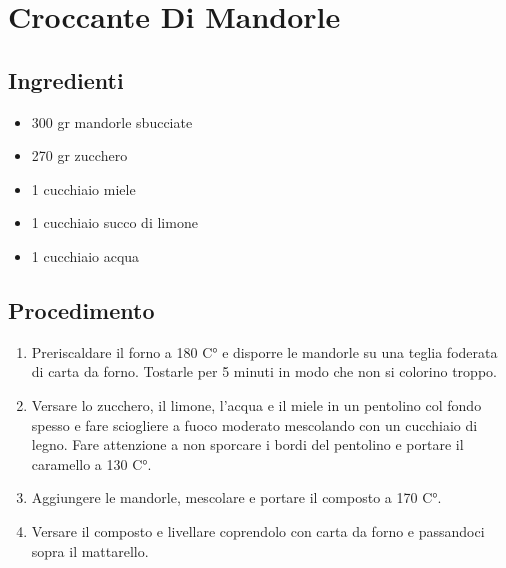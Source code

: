 \section{Croccante Di Mandorle}
\subsection{Ingredienti}
\begin{itemize}
\item 300 gr mandorle sbucciate  
\item 270 gr zucchero  
\item 1 cucchiaio miele  
\item 1 cucchiaio succo di limone  
\item 1 cucchiaio acqua
\end{itemize}
\subsection{Procedimento}
\begin{enumerate}
\item  Preriscaldare il forno a 180 C° e disporre le mandorle su una teglia foderata di carta da forno. Tostarle per 5 minuti in modo che non si colorino troppo.  
\item  Versare lo zucchero, il limone, l'acqua e il miele in un pentolino col fondo spesso e fare sciogliere a fuoco moderato mescolando con un cucchiaio di legno. Fare attenzione a non sporcare i bordi del pentolino e portare il caramello a 130 C°.  
\item  Aggiungere le mandorle, mescolare e portare il composto a 170 C°.  
\item  Versare il composto e livellare coprendolo con carta da forno e passandoci sopra il mattarello.
\end{enumerate}
